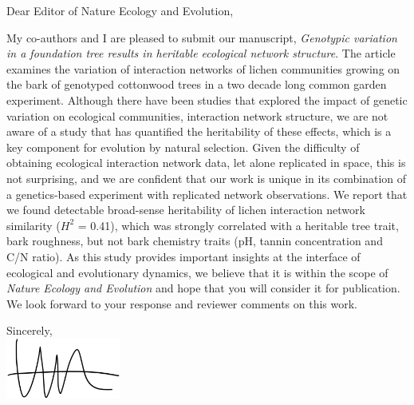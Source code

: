 \documentclass[12pt, a4paper]{letter} %
\begin{document}

\begin{letter}{

}


\opening{Dear Editor of Nature Ecology and Evolution,}


My co-authors and I are pleased to submit our manuscript,
\textit{Genotypic variation in a foundation tree results in heritable
  ecological network structure}. The article examines the variation of
interaction networks of lichen communities growing on the bark of
genotyped cottonwood trees in a two decade long common garden
experiment. Although there have been studies that explored the impact
of genetic variation on ecological communities, interaction network
structure, we are not aware of a study that has quantified the
heritability of these effects, which is a key component for evolution
by natural selection. Given the difficulty of obtaining ecological
interaction network data, let alone replicated in space, this is not
surprising, and we are confident that our work is unique in its
combination of a genetics-based experiment with replicated network
observations. We report that we found detectable broad-sense
heritability of lichen interaction network similarity ($H^2$ = 0.41),
which was strongly correlated with a heritable tree trait, bark
roughness, but not bark chemistry traits (pH, tannin concentration and
C/N ratio). As this study provides important insights at the interface
of ecological and evolutionary dynamics, we believe that it is within
the scope of \textit{Nature Ecology and Evolution} and hope that you
will consider it for publication. We look forward to your response and
reviewer comments on this work.


\closing{Sincerely, \\
  \hbox{\hspace{-10cm}}
\includegraphics[height=2cm]{mkl_sig.pdf}  
}




\end{letter}
\end{document}
